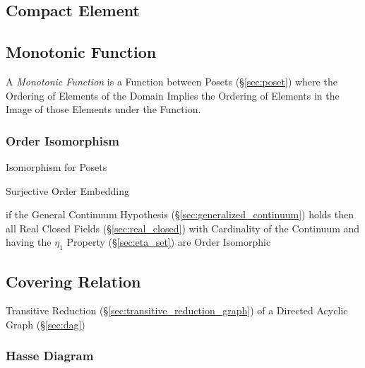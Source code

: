\subsection{Compact Element}\label{sec:compact_element}

\subsection{Monotonic Function}\label{sec:monotonic_function}

A \emph{Monotonic Function} is a Function between Posets
(\S\ref{sec:poset}) where the Ordering of Elements of the Domain
Implies the Ordering of Elements in the Image of those Elements under
the Function.



\subsubsection{Order Isomorphism}\label{sec:order_isomorphism}

Isomorphism for Posets

Surjective Order Embedding

if the General Continuum Hypothesis (\S\ref{sec:generalized_continuum}) holds
then all Real Closed Fields (\S\ref{sec:real_closed}) with Cardinality of the
Continuum and having the $\eta_1$ Property (\S\ref{sec:eta_set}) are Order
Isomorphic



\subsection{Covering Relation}\label{sec:covering_relation}

Transitive Reduction (\S\ref{sec:transitive_reduction_graph}) of a
Directed Acyclic Graph (\S\ref{sec:dag})



\subsubsection{Hasse Diagram}\label{sec:hasse_diagram}



